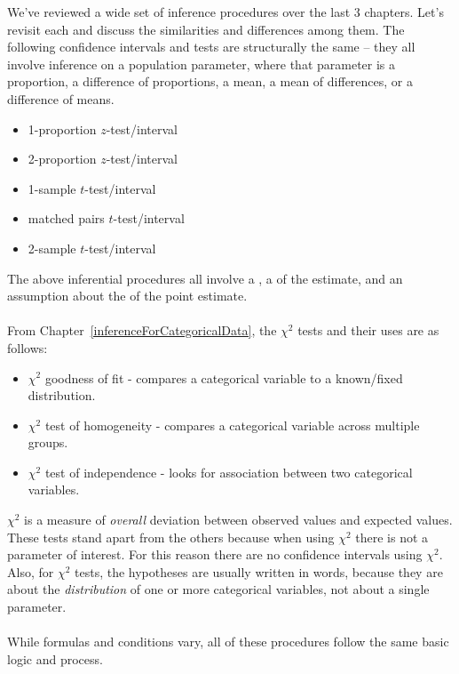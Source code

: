 \noindent We've reviewed a wide set of inference procedures over the last 3 chapters. Let's revisit each and discuss the similarities and differences among them.  The following confidence intervals and tests are structurally the same -- they all involve inference on a population parameter, where that parameter is a proportion, a difference of proportions, a mean, a mean of differences, or a difference of means. \vspace{-1mm}
\begin{itemize}
\setlength{\itemsep}{0mm}
\item 1-proportion $z$-test/interval
\item 2-proportion $z$-test/interval
\item 1-sample $t$-test/interval
\item matched pairs $t$-test/interval
\item 2-sample $t$-test/interval 
\end{itemize}
The above inferential procedures all involve a , a  of the estimate, and an assumption about the  of the point estimate.
\\
\\
From Chapter~\ref{inferenceForCategoricalData}, the $\chi^2$ tests and their uses are as follows:\vspace{-1mm}
\begin{itemize}
\setlength{\itemsep}{0mm}
\item $\chi^2$ goodness of fit - compares a categorical variable to a known/fixed distribution.
\item $\chi^2$ test of homogeneity - compares a categorical variable across multiple groups.
\item $\chi^2$ test of independence - looks for association between two categorical variables. 
\end{itemize}
$\chi^2$ is a measure of \emph{overall} deviation between observed values and expected values.  These tests stand apart from the others because when using $\chi^2$ there is not a parameter of interest.  For this reason there are no confidence intervals using $\chi^2$.  Also, for $\chi^2$ tests, the hypotheses are usually written in words, because they are about the \emph{distribution} of one or more categorical variables, not about a single parameter.  
\\
\\
While formulas and conditions vary, all of these procedures follow the same basic logic and process.
